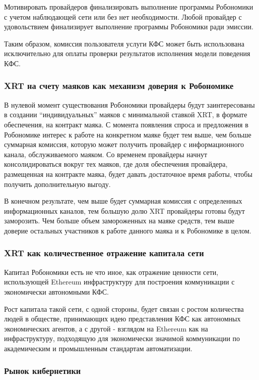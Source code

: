 \documentclass{article}
\begin{document}
Мотивировать провайдеров финализировать выполнение программы Робономики с учетом наблюдающей сети или без нет необходимости. Любой провайдер с удовольствием финализирует выполнение программы Робономики ради эмиссии.

Таким образом, комиссия пользователя услуги КФС может быть использована исключительно для оплаты проверки результатов исполнения модели поведения КФС.

\subsubsection{XRT на счету маяков как механизм доверия к Робономике}

В нулевой момент существования Робономики провайдеры будут заинтересованы в создании “индивидуальных” маяков с минимальной ставкой XRT, в формате обеспечения, на контракт маяка. С момента появления спроса и предложения в Робономике интерес к работе на конкретном маяке будет тем выше, чем больше суммарная комиссия, которую может получить провайдер с информационного канала, обслуживаемого маяком. Со временем провайдеры начнут консолидироваться вокруг тех маяков, где доля обеспечения провайдера, размещенная на контракте маяка, будет давать достаточное время работы, чтобы получить дополнительную выгоду. 

В конечном результате, чем выше будет суммарная комиссия с определенных информационных каналов, тем большую долю XRT провайдеры готовы будут заморозить. Чем больше объем замороженных на маяке средств, тем выше доверие остальных участников к работе данного маяка и к Робономике в целом.  

\subsubsection{XRT как количественное отражение капитала сети}

Капитал Робономики есть не что иное, как отражение ценности сети, использующей Ethereum инфраструктуру для построения коммуникации с экономически автономными КФС. 

Рост капитала такой сети, с одной стороны, будет связан с ростом количества людей в обществе, принимающих идею представления КФС как автономных экономических агентов, а с другой - взглядом на Ethereum как на инфраструктуру, подходящую для экономически значимой коммуникации по академическим и промышленным стандартам автоматизации.

\subsubsection{Рынок кибернетики}
\end{document}
